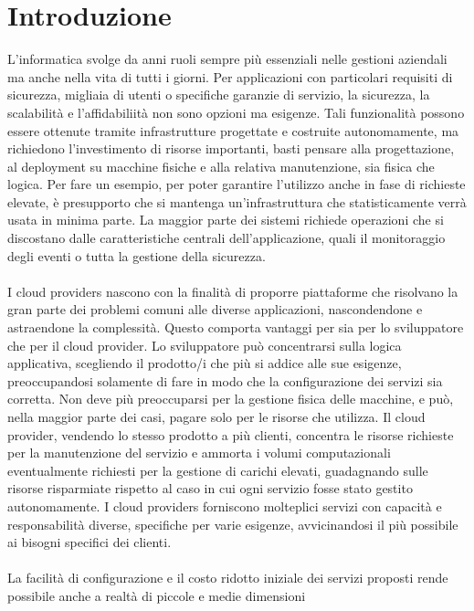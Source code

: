 \chapter*{Introduzione}
L'informatica svolge da anni ruoli sempre più essenziali nelle gestioni aziendali ma anche nella vita di tutti i giorni. 
Per applicazioni con particolari requisiti di sicurezza, migliaia di utenti o specifiche garanzie di servizio, la sicurezza, 
la scalabilità e l'affidabiliità non sono opzioni ma esigenze. 
Tali funzionalità possono essere ottenute tramite infrastrutture progettate e costruite autonomamente, 
ma richiedono l'investimento di risorse importanti, basti pensare alla progettazione, al deployment su macchine fisiche e alla relativa manutenzione, sia fisica che logica.
Per fare un esempio, per poter garantire l'utilizzo anche in fase di richieste elevate, è presupporto che si mantenga un'infrastruttura che statisticamente verrà usata in minima parte.
La maggior parte dei sistemi richiede operazioni che si discostano dalle caratteristiche centrali dell'applicazione, 
quali il monitoraggio degli eventi o tutta la gestione della sicurezza.\\
\\
I cloud providers nascono con la finalità di proporre piattaforme che risolvano la gran parte dei problemi comuni alle diverse applicazioni,
nascondendone e astraendone la complessità.
Questo comporta vantaggi per sia per lo sviluppatore che per il cloud provider. 
Lo sviluppatore può concentrarsi sulla logica applicativa, scegliendo il prodotto/i che più si addice alle sue esigenze, 
preoccupandosi solamente di fare in modo che la configurazione dei servizi sia corretta. 
Non deve più preoccuparsi per la gestione fisica delle macchine, e può, nella maggior parte dei casi, pagare solo per le risorse che utilizza.
Il cloud provider, vendendo lo stesso prodotto a più clienti, concentra le risorse richieste per la manutenzione del servizio
e ammorta i volumi computazionali eventualmente richiesti per la gestione di carichi elevati, 
guadagnando sulle risorse risparmiate rispetto al caso in cui ogni servizio fosse stato gestito autonomamente.
I cloud providers forniscono molteplici servizi con capacità e responsabilità diverse, specifiche per varie esigenze, 
avvicinandosi il più possibile ai bisogni specifici dei clienti.\\
\\
La facilità di configurazione e il costo ridotto iniziale dei servizi proposti rende possibile anche a realtà di piccole e medie dimensioni 
